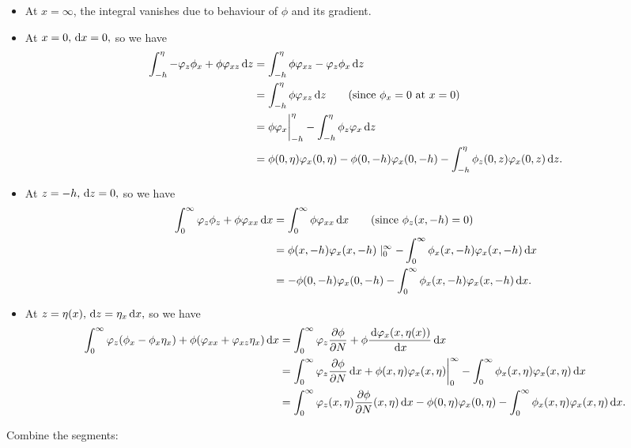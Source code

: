 \documentclass[10pt,reqno,oneside,a4paper]{article}
\begin{document}
\begin{itemize}
\item At $x = \infty$, the integral vanishes due to behaviour of $\phi$ and its gradient. 
\item At $x = 0, \,\mathrm{d} x = 0,$ so we have 
\begin{align*}
\int_{-h}^{\eta} - \varphi_z \phi_x + \phi \varphi_{xz} \,\mathrm{d} z &= \int_{-h}^{\eta} \phi \varphi_{xz} - \varphi_z \phi_x  \,\mathrm{d} z \\
&= \int_{-h}^{\eta} \phi \varphi_{xz} \,\mathrm{d} z \qquad \text{(since $\phi_x = 0$ at $x = 0$)} \\
&= \phi \varphi_x \bigg|^{\eta}_{-h} - \int_{-h}^{\eta} \phi_{z} \varphi_{x} \,\mathrm{d} z \\
&= \phi(0, \eta) \varphi_x(0, \eta) - \phi(0, -h) \varphi_x(0, -h) - \int_{-h}^{\eta} \phi_{z}(0,z) \varphi_{x}(0,z) \,\mathrm{d} z. 
\end{align*} 
\item At $z = -h, \,\mathrm{d} z = 0,$ so we have 
\begin{align*}
\int^{\infty}_{0} \varphi_z \phi_z + \phi \varphi_{xx} \,\mathrm{d} x &= \int^{\infty}_{0} \phi \varphi_{xx} \,\mathrm{d} x \qquad \text{(since $\phi_{z}(x,-h) = 0$)}\\
&= \phi(x,-h) \varphi_{x}(x,-h) \mid^{\infty}_{0} - \int^{\infty}_{0} \phi_x(x,-h) \varphi_x(x,-h) \,\mathrm{d} x \\
&= - \phi(0,-h) \varphi_{x}(0,-h) - \int^{\infty}_{0} \phi_x(x,-h) \varphi_x(x,-h) \,\mathrm{d} x.
\end{align*}
\item At $z = \eta(x), \,\mathrm{d} z = \eta_x \,\mathrm{d} x,$ so we have
\begin{align*}
\int_{0}^{\infty} \varphi_z(\phi_x - \phi_x \eta_x) + \phi(\varphi_{xx}  + \varphi_{xz}\eta_x) \,\mathrm{d} x &= \int_{0}^{\infty} \varphi_z \frac{\partial \phi}{\partial N}+ \phi \frac{\,\mathrm{d} \varphi_x(x, \eta(x))}{\,\mathrm{d} x} \,\mathrm{d} x \\
&= \int_{0}^{\infty} \varphi_z\frac{\partial \phi}{\partial N}\,\mathrm{d} x + \phi(x, \eta) \varphi_x(x, \eta) \bigg|^{\infty}_{0} - \int^{\infty}_{0}\phi_x(x, \eta)  \varphi_x(x, \eta) \,\mathrm{d} x \\
&= \int_{0}^{\infty} \varphi_z(x, \eta)\frac{\partial \phi}{\partial N}(x, \eta)\,\mathrm{d} x - \phi(0, \eta) \varphi_x(0, \eta) - \int^{\infty}_{0}\phi_x(x, \eta)  \varphi_x(x, \eta) \,\mathrm{d} x.
\end{align*}
 \end{itemize}
Combine the segments:
\end{document}
